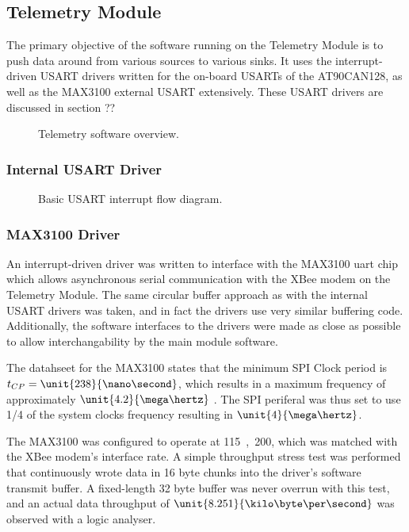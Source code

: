 \subsection{Telemetry Module}

The primary objective of the software running on the Telemetry Module is to push data around from various sources to various sinks. It uses the interrupt-driven USART drivers written for the on-board USARTs of the AT90CAN128, as well as the MAX3100 external USART extensively. These USART drivers are discussed in section ?? 

\begin{figure}[H]
\centering

\caption{Telemetry software overview.}
\label{fig:telemetry_software_implementation}
\end{figure}

\subsubsection{Internal USART Driver}

\begin{figure}[]
\centering

\caption{Basic USART interrupt flow diagram.}
\label{fig:usart_driver_flow}
\end{figure}


\subsubsection{MAX3100 Driver}

An interrupt-driven driver was written to interface with the MAX3100 uart chip which allows asynchronous serial communication with the XBee modem on the Telemetry Module. The same circular buffer approach as with the internal USART drivers was taken, and in fact the drivers use very similar buffering code. Additionally, the software interfaces to the drivers were made as close as possible to allow interchangability by the main module software.

The datahseet for the MAX3100 states that the minimum SPI Clock period is $t_{CP}=\unit{238}{\nano\second}$, which results in a maximum frequency of approximately $\unit{4.2}{\mega\hertz}$ \cite{MAX3100}. The SPI periferal was thus set to use 1/4 of the system clocks frequency resulting in $\unit{4}{\mega\hertz}$.

The MAX3100 was configured to operate at \unit{115,200}{\kilo\bit\per\second}, which was matched with the XBee modem's interface rate. A simple throughput stress test was performed that continuously wrote data in 16 byte chunks into the driver's software transmit buffer. A fixed-length 32 byte buffer was never overrun with this test, and an actual data throughput of $\unit{8.251}{\kilo\byte\per\second}$ was observed with a logic analyser.

